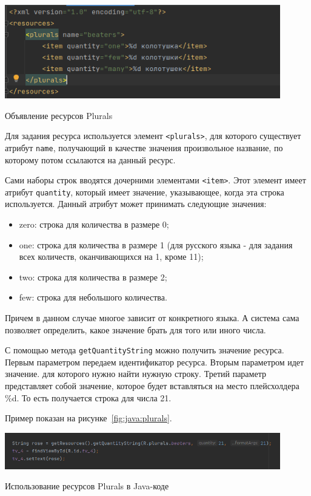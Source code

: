 \begin{image}
	\includegraphics[width=0.9\textwidth]{Screenshot from 2023-03-30 18-44-25}
	\caption{Объявление ресурсов Plurals}
	\label{fig:xml:plurals}
\end{image}

Для задания ресурса используется элемент \texttt{<plurals>}, для которого
существует атрибут \texttt{name}, получающий в качестве значения произвольное
название, по которому потом ссылаются на данный ресурс.\par
Сами наборы строк вводятся дочерними элементами \texttt{<item>}. Этот элемент
имеет атрибут \texttt{quantity}, который имеет значение, указывающее,
когда эта строка используется. Данный атрибут может принимать следующие
значения:

\begin{itemize}
	\item zero: строка для количества в размере 0;
	\item one: строка для количества в размере 1 (для русского языка - для
		задания всех количеств, оканчивающихся на 1, кроме 11);
	\item two: строка для количества в размере 2;
	\item few: строка для небольшого количества.
\end{itemize}

Причем в данном случае многое зависит от конкретного языка. А система
сама позволяет определить, какое значение брать для того или иного числа.

С помощью метода \texttt{getQuantityString} можно получить значение ресурса.
Первым параметром передаем идентификатор ресурса. Вторым параметром
идет значение. для которого нужно найти нужную строку. Третий параметр
представляет собой значение, которое будет вставляться на место
плейсхолдера \%d. То есть получается строка для числа 21.\par
Пример показан на рисунке~\ref{fig:java:plurals}.

\begin{image}
	\includegraphics[width=0.9\textwidth]{Screenshot from 2023-03-30 19-03-46}
	\caption{Использование ресурсов Plurals в Java-коде}
	\label{fig:java:plurals}
\end{image}

